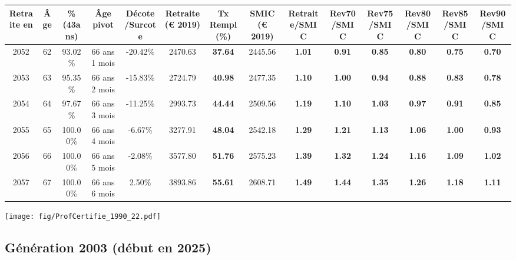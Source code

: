 \begin{adjustbox}{max width=\textwidth} 
\begin{tabular}[htb]{|c|c||c|c|c||c|c||c||c|c|c|c|c|c|} 
\hline 
 Retraite en &  Âge &  \%(43ans) &  Âge pivot &  Décote/Surcote &  Retraite (\euro{} 2019) &  Tx Rempl(\%) &  SMIC (\euro{} 2019) &  Retraite/SMIC &  Rev70/SMIC &  Rev75/SMIC &  Rev80/SMIC &  Rev85/SMIC &  Rev90/SMIC \\ 
\hline \hline 
 2052 &  62 &  93.02\% &  66 ans 1 mois &  -20.42\% &  2470.63 &  {\bf 37.64} &  2445.56 &  {\bf 1.01} &  {\bf {\color{red} 0.91}} &  {\bf {\color{red} 0.85}} &  {\bf {\color{red} 0.80}} &  {\bf {\color{red} 0.75}} &  {\bf {\color{red} 0.70}} \\ 
\hline 
 2053 &  63 &  95.35\% &  66 ans 2 mois &  -15.83\% &  2724.79 &  {\bf 40.98} &  2477.35 &  {\bf 1.10} &  {\bf 1.00} &  {\bf {\color{red} 0.94}} &  {\bf {\color{red} 0.88}} &  {\bf {\color{red} 0.83}} &  {\bf {\color{red} 0.78}} \\ 
\hline 
 2054 &  64 &  97.67\% &  66 ans 3 mois &  -11.25\% &  2993.73 &  {\bf 44.44} &  2509.56 &  {\bf 1.19} &  {\bf 1.10} &  {\bf 1.03} &  {\bf {\color{red} 0.97}} &  {\bf {\color{red} 0.91}} &  {\bf {\color{red} 0.85}} \\ 
\hline 
 2055 &  65 &  100.00\% &  66 ans 4 mois &  -6.67\% &  3277.91 &  {\bf 48.04} &  2542.18 &  {\bf 1.29} &  {\bf 1.21} &  {\bf 1.13} &  {\bf 1.06} &  {\bf {\color{red} 1.00}} &  {\bf {\color{red} 0.93}} \\ 
\hline 
 2056 &  66 &  100.00\% &  66 ans 5 mois &  -2.08\% &  3577.80 &  {\bf 51.76} &  2575.23 &  {\bf 1.39} &  {\bf 1.32} &  {\bf 1.24} &  {\bf 1.16} &  {\bf 1.09} &  {\bf 1.02} \\ 
\hline 
 2057 &  67 &  100.00\% &  66 ans 6 mois &  2.50\% &  3893.86 &  {\bf 55.61} &  2608.71 &  {\bf 1.49} &  {\bf 1.44} &  {\bf 1.35} &  {\bf 1.26} &  {\bf 1.18} &  {\bf 1.11} \\ 
\hline 
\hline 
\end{tabular} 
\end{adjustbox} 
 
 \vspace{0.1cm} 

 \begin{center}\texttt{[image: fig/ProfCertifie\_1990\_22.pdf]}\end{center} \label{fig/ProfCertifie_1990_22.pdf} 

\newpage 
 
\subsection{Génération 2003 (début en 2025)} 

